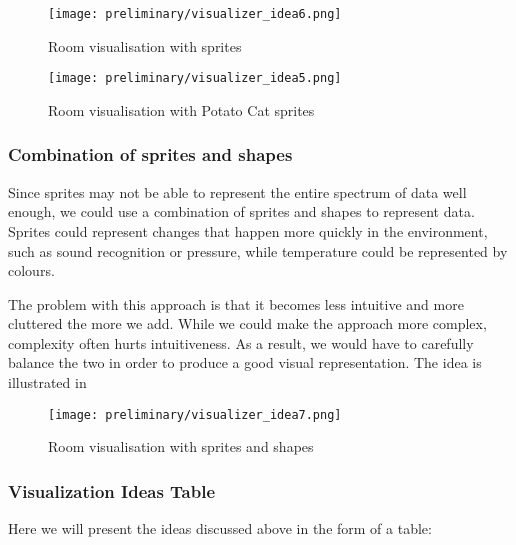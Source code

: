\documentclass[../document]{subfiles}
\begin{document}
\begin{figure}[H]
	\texttt{[image: preliminary/visualizer\_idea6.png]}
	\caption{Room visualisation with sprites}
	\label{fig:visualizer_idea6}
\end{figure}

\begin{figure}[H]
	\texttt{[image: preliminary/visualizer\_idea5.png]}
	\caption{Room visualisation with Potato Cat sprites}
	\label{fig:visualizer_idea5}
\end{figure}

\subsubsection{Combination of sprites and shapes}

Since sprites may not be able to represent the entire spectrum of data well enough, we could use a combination of sprites and shapes to represent data. Sprites could represent changes that happen more quickly in the environment, such as sound recognition or pressure, while temperature could be represented by colours.

The problem with this approach is that it becomes less intuitive and more cluttered the more we add. While we could make the approach more complex, complexity often hurts intuitiveness. As a result, we would have to carefully balance the two in order to produce a good visual representation. The idea is illustrated in 

\begin{figure}[H]
\texttt{[image: preliminary/visualizer\_idea7.png]}
\caption{Room visualisation with sprites and shapes}
\label{fig:visualizer_idea7}
\end{figure}

\subsubsection{Visualization Ideas Table}
Here we will present the ideas discussed above in the form of a table:
\end{document}
